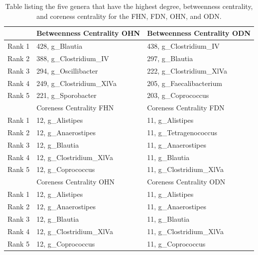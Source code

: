 \begin{table}[!hbtp]
\begin{tabular}{rll}
 & Betweenness Centrality OHN & Betweenness Centrality ODN \\ 
  \midrule
Rank 1 & 428,  g\_Blautia & 438,  g\_Clostridium\_IV \\ 
  Rank 2 & 388,  g\_Clostridium\_IV & 297,  g\_Blautia \\ 
  Rank 3 & 294,  g\_Oscillibacter & 222,  g\_Clostridium\_XlVa \\ 
  Rank 4 & 249,  g\_Clostridium\_XlVa & 205,  g\_Faecalibacterium \\ 
  Rank 5 & 221,  g\_Sporobacter & 203,  g\_Coprococcus \\ 
\bottomrule \toprule
 & Coreness Centrality FHN & Coreness Centrality FDN \\ 
  \midrule
Rank 1 & 12,  g\_Alistipes & 11,  g\_Alistipes \\ 
  Rank 2 & 12,  g\_Anaerostipes & 11,  g\_Tetragenococcus \\ 
  Rank 3 & 12,  g\_Blautia & 11,  g\_Anaerostipes \\ 
  Rank 4 & 12,  g\_Clostridium\_XlVa & 11,  g\_Blautia \\ 
  Rank 5 & 12,  g\_Coprococcus & 11,  g\_Clostridium\_XlVa \\ 
   \midrule
   
 & Coreness Centrality OHN & Coreness Centrality ODN \\ 
  \midrule
Rank 1 & 12,  g\_Alistipes & 11,  g\_Alistipes \\ 
  Rank 2 & 12,  g\_Anaerostipes & 11,  g\_Anaerostipes \\ 
  Rank 3 & 12,  g\_Blautia & 11,  g\_Blautia \\ 
  Rank 4 & 12,  g\_Clostridium\_XlVa & 11,  g\_Clostridium\_XlVa \\ 
  Rank 5 & 12,  g\_Coprococcus & 11,  g\_Coprococcus \\ 
   \bottomrule
\end{tabular}
\caption{Table listing the five genera that have the highest degree, betweenness centrality, and coreness centrality for the \acrfull{FHN}, \acrfull{FDN}, \acrfull{OHN}, and \acrfull{ODN}.}
\label{tab:node-measures}
\end{table}
